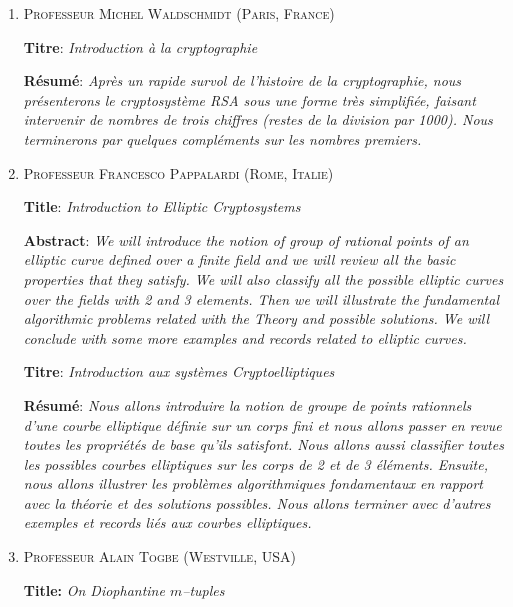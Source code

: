 \documentclass[a4paper,10pt]{article}
\begin{document}
\begin{enumerate}
 \item \textsc{Professeur Michel Waldschmidt (Paris, France)}\medskip

\textbf{Titre}: \textit{Introduction \`a la cryptographie}

\textbf{R\'esum\'e}: 
\textit{Apr\`es un rapide survol de l'histoire de la cryptographie, nous pr\'esenterons le cryptosyst\`eme RSA sous une forme tr\`es simplifi\'ee, 
faisant intervenir de nombres de trois chiffres (restes de la division par 1000). Nous terminerons par quelques compl\'ements sur les nombres premiers.} \bigskip

\item \textsc{Professeur Francesco Pappalardi (Rome, Italie)} \medskip

\textbf{Title}: \textit{Introduction to Elliptic Cryptosystems}

\textbf{Abstract}: 
\textit{We will introduce the notion of group of rational points of an elliptic curve defined over a finite field and 
we will review all the basic properties that they satisfy. We will also classify all the possible elliptic curves over the fields with 2 and 3 elements. 
Then we will illustrate the fundamental algorithmic problems related with the Theory and possible solutions. We will conclude with some more examples 
and records related to elliptic curves.}\medskip

\textbf{Titre}: \textit{Introduction aux syst\`emes Cryptoelliptiques}

\textbf{R\'esum\'e}: 
\textit{Nous allons introduire la notion de groupe de points  rationnels d'une courbe elliptique d\'efinie sur un corps 
fini et nous  allons passer en revue toutes les propri\'et\'es de base qu'ils satisfont.  
Nous allons aussi classifier toutes les possibles courbes elliptiques sur les corps de 2 et de 3 \'el\'ements. 
Ensuite, nous allons illustrer  les probl\`emes algorithmiques fondamentaux en rapport avec la th\'eorie  
et des solutions possibles. Nous allons terminer avec d'autres exemples et records li\'es aux  courbes elliptiques.}\bigskip

\item \textsc{Professeur Alain Togbe (Westville, USA)}\medskip

\textbf{Title:} \textit{On Diophantine $m$--tuples}


\end{enumerate}
\end{document}
